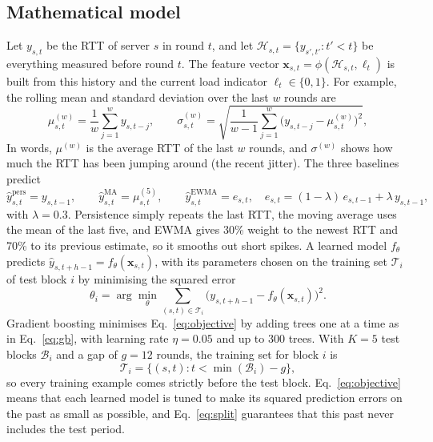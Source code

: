 \documentclass[pdflatex,sn-mathphys-num]{sn-jnl}
\begin{document}
\subsection{Mathematical model}\label{sec:model}

Let $y_{s,t}$ be the RTT of server $s$ in round $t$, and let $\mathcal{H}_{s,t} = \{y_{s',t'} : t' < t\}$ be everything measured before round $t$. The feature vector $\mathbf{x}_{s,t} = \phi(\mathcal{H}_{s,t}, \ell_t)$ is built from this history and the current load indicator $\ell_t \in \{0,1\}$. For example, the rolling mean and standard deviation over the last $w$ rounds are
\begin{equation}
\mu^{(w)}_{s,t} = \frac{1}{w}\sum_{j=1}^{w} y_{s,t-j}, \qquad
\sigma^{(w)}_{s,t} = \sqrt{\frac{1}{w-1}\sum_{j=1}^{w}\big(y_{s,t-j} - \mu^{(w)}_{s,t}\big)^2},
\label{eq:rolling}
\end{equation}
In words, $\mu^{(w)}$ is the average RTT of the last $w$ rounds, and $\sigma^{(w)}$ shows how much the RTT has been jumping around (the recent jitter). The three baselines predict
\begin{equation}
\hat{y}^{\text{pers}}_{s,t} = y_{s,t-1}, \qquad
\hat{y}^{\text{MA}}_{s,t} = \mu^{(5)}_{s,t}, \qquad
\hat{y}^{\text{EWMA}}_{s,t} = e_{s,t}, \quad e_{s,t} = (1-\lambda)\,e_{s,t-1} + \lambda\, y_{s,t-1},
\label{eq:baselines}
\end{equation}
with $\lambda = 0.3$. Persistence simply repeats the last RTT, the moving average uses the mean of the last five, and EWMA gives 30\% weight to the newest RTT and 70\% to its previous estimate, so it smooths out short spikes. A learned model $f_\theta$ predicts $\hat{y}_{s,t+h-1} = f_\theta(\mathbf{x}_{s,t})$, with its parameters chosen on the training set $\mathcal{T}_i$ of test block $i$ by minimising the squared error
\begin{equation}
\theta_i = \arg\min_{\theta} \sum_{(s,t) \in \mathcal{T}_i} \big(y_{s,t+h-1} - f_\theta(\mathbf{x}_{s,t})\big)^2.
\label{eq:objective}
\end{equation}
Gradient boosting minimises Eq.~\ref{eq:objective} by adding trees one at a time as in Eq.~\ref{eq:gb}, with learning rate $\eta = 0.05$ and up to 300 trees. With $K = 5$ test blocks $\mathcal{B}_i$ and a gap of $g = 12$ rounds, the training set for block $i$ is
\begin{equation}
\mathcal{T}_i = \{(s,t) : t < \min(\mathcal{B}_i) - g\},
\label{eq:split}
\end{equation}
so every training example comes strictly before the test block. Eq.~\ref{eq:objective} means that each learned model is tuned to make its squared prediction errors on the past as small as possible, and Eq.~\ref{eq:split} guarantees that this past never includes the test period.
\end{document}
